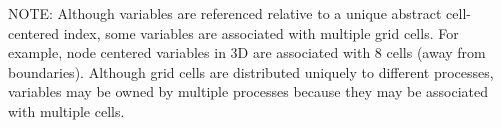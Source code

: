 \documentclass{article}
\begin{document}
\begin{cxxentry}
\begin{cxxentry}
\begin{cxxunion}
\begin{cxxdoc}
NOTE: Although variables are referenced relative to a unique
abstract cell-centered index, some variables are associated
with multiple grid cells.  For example, node centered
variables in 3D are associated with 8 cells (away from
boundaries).  Although grid cells are distributed uniquely to
different processes, variables may be owned by multiple
processes because they may be associated with multiple cells.
\end{cxxdoc}
\end{cxxunion}
\end{cxxentry}
\end{cxxentry}
\begin{cxxClassGraph}
\label{cxx.}
\end{cxxClassGraph}
\end{document}
